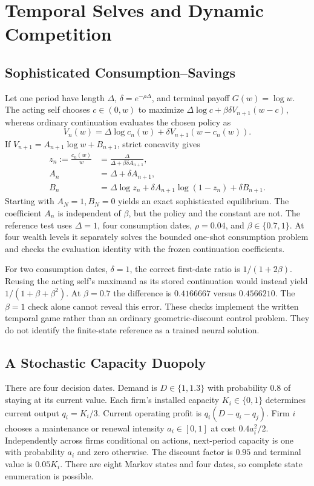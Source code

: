 \section{Temporal Selves and Dynamic Competition}
\subsection{Sophisticated Consumption--Savings}
Let one period have length $\Delta$, $\delta=e^{-\rho\Delta}$, and terminal payoff $G(w)=\log w$. The acting self chooses $c\in(0,w)$ to maximize $\Delta\log c+\beta\delta V_{n+1}(w-c)$, whereas ordinary continuation evaluates the chosen policy as
\[
 V_n(w)=\Delta\log c_n(w)+\delta V_{n+1}(w-c_n(w)).
\]
If $V_{n+1}=A_{n+1}\log w+B_{n+1}$, strict concavity gives
\begin{align*}
 z_n:=\frac{c_n(w)}w&=\frac{\Delta}{\Delta+\beta\delta A_{n+1}},\\
 A_n&=\Delta+\delta A_{n+1},\\
 B_n&=\Delta\log z_n+\delta A_{n+1}\log(1-z_n)+\delta B_{n+1}.
\end{align*}
Starting with $A_N=1,B_N=0$ yields an exact sophisticated equilibrium. The coefficient $A_n$ is independent of $\beta$, but the policy and the constant are not. The reference test uses $\Delta=1$, four consumption dates, $\rho=0.04$, and $\beta\in\{0.7,1\}$. At four wealth levels it separately solves the bounded one-shot consumption problem and checks the evaluation identity with the frozen continuation coefficients.

For two consumption dates, $\delta=1$, the correct first-date ratio is $1/(1+2\beta)$. Reusing the acting self's maximand as its stored continuation would instead yield $1/(1+\beta+\beta^2)$. At $\beta=0.7$ the difference is $0.4166667$ versus $0.4566210$. The $\beta=1$ check alone cannot reveal this error. These checks implement the written temporal game rather than an ordinary geometric-discount control problem. They do not identify the finite-state reference as a trained neural solution.

\subsection{A Stochastic Capacity Duopoly}
There are four decision dates. Demand is $D\in\{1,1.3\}$ with probability $0.8$ of staying at its current value. Each firm's installed capacity $K_i\in\{0,1\}$ determines current output $q_i=K_i/3$. Current operating profit is $q_i(D-q_i-q_j)$. Firm $i$ chooses a maintenance or renewal intensity $a_i\in[0,1]$ at cost $0.4a_i^2/2$. Independently across firms conditional on actions, next-period capacity is one with probability $a_i$ and zero otherwise. The discount factor is $0.95$ and terminal value is $0.05K_i$. There are eight Markov states and four dates, so complete state enumeration is possible.


